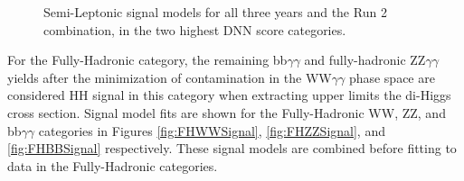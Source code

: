 \begin{figure}[!htbp]
    \setcounter{subfigure}{0}
    \centering
    \qquad
    \caption{Semi-Leptonic signal models for all three years and the Run 2 combination, in the two highest DNN score categories.}
    \label{fig:SLSignal_01}
\end{figure}

For the Fully-Hadronic category, the remaining bb$\gamma\gamma$ and fully-hadronic ZZ$\gamma\gamma$ yields after the minimization of contamination in the WW$\gamma\gamma$ phase space are considered HH signal in this category when extracting upper limits the di-Higgs cross section. Signal
model fits are shown for the Fully-Hadronic WW, ZZ, and bb$\gamma\gamma$ categories in Figures \ref{fig:FHWWSignal}, \ref{fig:FHZZSignal}, and  \ref{fig:FHBBSignal} respectively. These signal models
are combined before fitting to data in the Fully-Hadronic categories.

